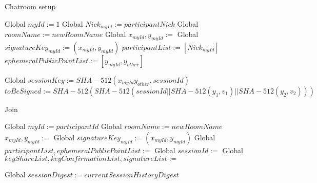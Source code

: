 \begin{algorithm}[H]
\caption{Chatroom setup}
\label{alg_chat_setup}
\begin{algorithmic}[1]
  \State Global $myId := 1$
  \State Global $Nick_{myId} := participantNick$
  \State Global $roomName := newRoomName$
  \State Global $x_{myId}, y_{myId} :=$ 
  \State Global $signatureKey_{myId} := (x_{myId},y_{myId})$
  \State $participantList := [Nick_{myId}]$
  \State $ephemeralPublicPointList := [y_{myId}, y_{other}]$
\EndProcedure

  \State {}
  \State Global $sessionKey := SHA-512(x_{myId}y_{other}, sessionId)$
  \State $toBeSigned := SHA-512(SHA-512(sessionId||SHA-512(y_1, v_1)||SHA-512(y_2,v_2)))$
  \State {}
\EndProcedure

\end{algorithmic}
\end{algorithm}

\begin{algorithm}[H]
\caption{Join}
\label{alg_join}
\begin{algorithmic}[1]
  \State Global $myId := participantId$
  \State Global $roomName := newRoomName$
  \State $x_{myId}, y_{myId} := $
  \State Global $signatureKey_{myId} := (x_{myId},y_{myId})$
  \State {}
  \State Global $participantList, ephemeralPublicPointList :=$ 
  \State Global $sessionId := $ 
  \State {}
  \State {}
  \State Global $keyShareList, keyConfirmationList, signatureList :=$ 
  \State {}
  \State {}
\EndProcedure

  \State Global $sessionDigest := currentSessionHistoryDigest$
\EndProcedure

\end{algorithmic}
\end{algorithm}

